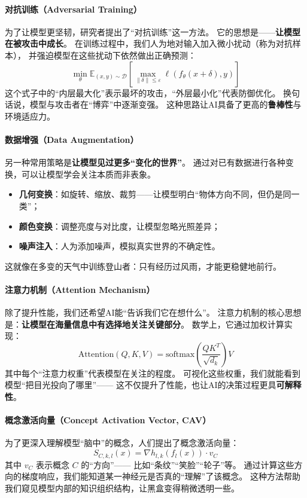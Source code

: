 \paragraph{对抗训练（Adversarial Training）}  
为了让模型更坚韧，研究者提出了“对抗训练”这一方法。  
它的思想是——\textbf{让模型在被攻击中成长}。  
在训练过程中，我们人为地对输入加入微小扰动（称为对抗样本），  
并强迫模型在这些扰动下依然做出正确预测：  
$$\min_\theta \mathbb{E}_{(x,y) \sim \mathcal{D}} \left[ \max_{\|\delta\| \leq \varepsilon} \ell(f_\theta(x + \delta), y) \right]$$  
这个式子中的“内层最大化”表示最坏的攻击，“外层最小化”代表防御优化。  
换句话说，模型与攻击者在“博弈”中逐渐变强。  
这种思路让AI具备了更高的\textbf{鲁棒性}与环境适应力。

\paragraph{数据增强（Data Augmentation）}  
另一种常用策略是\textbf{让模型见过更多“变化的世界”}。  
通过对已有数据进行各种变换，可以让模型学会关注本质而非表象。  

\begin{itemize}
\item \textbf{几何变换}：如旋转、缩放、裁剪——让模型明白“物体方向不同，但仍是同一类”；  
\item \textbf{颜色变换}：调整亮度与对比度，让模型忽略光照差异；  
\item \textbf{噪声注入}：人为添加噪声，模拟真实世界的不确定性。  
\end{itemize}
这就像在多变的天气中训练登山者：只有经历过风雨，才能更稳健地前行。

\paragraph{注意力机制（Attention Mechanism）}  
除了提升性能，我们还希望AI能“告诉我们它在想什么”。  
注意力机制的核心思想是：\textbf{让模型在海量信息中有选择地关注关键部分}。  
数学上，它通过加权计算实现：  
$$\text{Attention}(Q,K,V)=\text{softmax}\left(\frac{QK^T}{\sqrt{d_k}}\right)V$$  
其中每个“注意力权重”代表模型在关注的程度。  
可视化这些权重，我们就能看到模型“把目光投向了哪里”——  
这不仅提升了性能，也让AI的决策过程更具\textbf{可解释性}。

\paragraph{概念激活向量（Concept Activation Vector, CAV）}  
为了更深入理解模型“脑中”的概念，人们提出了概念激活向量：  
$$S_{C,k,l}(x)=\nabla h_{l,k}(f_l(x)) \cdot v_C$$  
其中 $v_C$ 表示概念 $C$ 的“方向”——  
比如“条纹”“笑脸”“轮子”等。  
通过计算这些方向的梯度响应，我们能知道某一神经元是否真的“理解”了该概念。  
这种方法帮助我们窥见模型内部的知识组织结构，让黑盒变得稍微透明一些。

